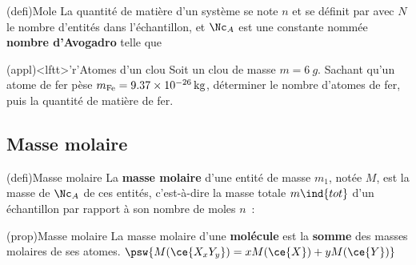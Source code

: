 \documentclass[../../main/main.tex]{subfiles}
\begin{document}
\begin{tcbraster}[raster columns=2, raster equal height=rows]
	\begin{tcb*}[label=def:mole](defi){Mole}
		La quantité de matière d'un système se note $n$ et se définit par
		\psw{%
			\[
				\boxed{n = \frac{N}{\Nc_A}}
				\quad \text{en \textbf{moles}, \si{mol}}
			\]
		}%
		avec $N$ le nombre d'entités dans l'échantillon, et $\Nc_A$ est une
		constante nommée \textbf{nombre d'Avogadro} telle que
		\psw{%
			\[
				\Nc_A = \SI{6.02214076e23}{mol^{-1}}
			\]
		}%
		\vspace{-15pt}
	\end{tcb*}
	\begin{tcb}[label=exem:nbat](appl)<lftt>'r'{Atomes d'un clou}
		Soit un clou de masse $m = \SI{6}{g}$. Sachant qu'un atome de fer pèse
		$m_{\rm Fe} = \SI{9.37e-26}{kg}$, déterminer le nombre d'atomes de fer, puis
		la quantité de matière de fer.
		\tcblower
		\vspace{-15pt}
	\end{tcb}
\end{tcbraster}

\subsection{Masse molaire}

\begin{tcb*}[label=massemol, sidebyside, righthand ratio=.3](defi){Masse molaire}
	La \textbf{masse molaire} d'une entité de masse $m_1$, notée $M$, est la
	masse de $\Nc_A$ de ces entités, c'est-à-dire la masse totale $m\ind{tot}$ d'un
	échantillon par rapport à son nombre de moles $n$~:
	\psw{%
		\[
			M = m_1 \Nc_A
			\Lra
			M = \frac{m\ind{tot}}{n}
		\]
	}%
	\vspace{-15pt}
	\tcblower
\end{tcb*}

\begin{tcb*}[sidebyside, righthand ratio=.4](prop){Masse molaire}
	La masse molaire d'une \textbf{molécule} est la \textbf{somme} des masses
	molaires de ses atomes.
	\tcblower
	$\psw{M(\ce{X_xY_y}) = xM(\ce{X}) + yM(\ce{Y})}$
\end{tcb*}
\end{document}
